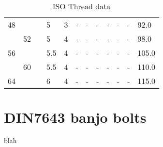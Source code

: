 \begin{table}[h!]
\begin{longtable}{lll|ll|llllll|l}
    48  &    &    &5    &3          &-   &-      &-      &-      &- &-    &92.0  \\
        &52  &    &5    &4          &-   &-      &-      &-      &- &-    &98.0  \\
    56  &    &    &5.5  &4          &-   &-      &-      &-      &- &-    &105.0 \\
        &60  &    &5.5  &4          &-   &-      &-      &-      &- &-    &110.0 \\
    64  &    &    &6    &4          &-   &-      &-      &-      &- &-    &115.0 \\
\end{longtable}
\caption{ISO Thread data}
\end{table}
\clearpage



\section{DIN7643 banjo bolts}
blah
\\ \\ \\ \\ \\ \\ \\ \\ \\ \\ \\ \\ \\ \\ \\ \\ \\ \\


